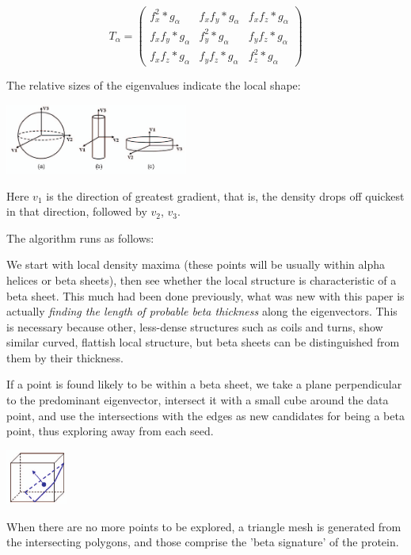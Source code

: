 \documentclass{article}
\begin{document}
\[
  T_{\alpha} =
\left( \begin{array}{ccc}
  f_{x}^2*g_{\alpha} & f_{x}f_{y}*g_{\alpha} & f_{x}f_{z}*g_{\alpha} \\
  f_{x}f_{y}*g_{\alpha} & f_{y}^2*g_{\alpha} & f_{y}f_{z}*g_{\alpha} \\
  f_{x}f_{z}*g_{\alpha} & f_{y}f_{z}*g_{\alpha} & f_{z}^2*g_{\alpha}
\end{array} \right)
\]


The relative sizes of the eigenvalues indicate the local shape:
\begin{center}
  \includegraphics[width=60mm]{shapes.png}
\end{center}

Here $v_1$ is the direction of greatest gradient, that is, the density drops off quickest
in that direction, followed by $v_2$, $v_3$.

The algorithm runs as follows:

We start with local density maxima (these points will be usually
within alpha helices or beta sheets), then see whether the local
structure is characteristic of a beta sheet. This much had been done
previously, what was new with this paper is actually \emph{finding the
length of probable beta thickness} along the eigenvectors. This is
necessary because other, less-dense structures such as coils and
turns, show similar curved, flattish local structure, but beta sheets
can be distinguished from them by their thickness.

If a point is found likely to be within a beta sheet, we take a plane
perpendicular to the predominant eigenvector, intersect it with a small
cube around the data point, and use the intersections with the edges
as new candidates for being a beta point, thus exploring away from each seed.

\begin{center}
  \includegraphics[width=20mm]{cube-plane.png}
\end{center}

When there are no more points to be explored, a triangle mesh is generated
from the intersecting polygons, and those comprise the 'beta signature'
of the protein.
\end{document}
